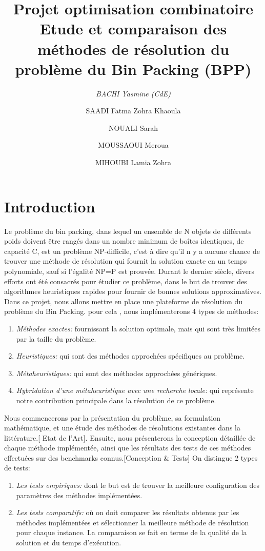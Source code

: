 \documentclass[12pt,a4paper, titlepage]{report}
\title{Projet optimisation combinatoire\\ Etude et comparaison des méthodes de résolution du problème du Bin Packing (BPP)}
\author{ 
    \emph{BACHI Yasmine (CdE)}
    \and
    SAADI Fatma Zohra Khaoula
    \and 
    NOUALI Sarah
    \and 
    MOUSSAOUI Meroua
    \and 
    MIHOUBI Lamia Zohra}
\begin{document}
    \maketitle
    
    \tableofcontents
    \chapter*{Introduction}
      
    Le problème du bin packing, dans lequel un ensemble de N objets de différents poids doivent être rangés dans un nombre minimum de boîtes identiques, de capacité C, est un problème NP-difficile, c’est à dire qu’il n y a aucune chance de trouver une méthode de résolution qui fournit la solution exacte en un temps polynomiale, sauf si l’égalité NP=P est prouvée. 
    Durant le dernier siècle, divers efforts ont été consacrés pour étudier ce problème, dans le but de trouver des algorithmes heuristiques rapides pour fournir de bonnes solutions approximatives.
    Dans ce projet, nous allons mettre en place une plateforme de résolution du problème du Bin Packing. pour cela , nous implémenterons 4 types de méthodes: 
    \begin{enumerate}
        \item \emph{Méthodes exactes:} fournissant la solution optimale, mais qui sont très limitées par la taille du problème. 
        \item \emph{Heuristiques:} qui sont des méthodes approchées spécifiques au problème.
        \item \emph{Métaheuristiques:} qui sont des méthodes approchées génériques.
        \item \emph{Hybridation d'une métaheuristique avec une recherche locale:} qui représente notre contribution principale dans la résolution de ce problème.
    \end{enumerate}
    Nous commencerons par la présentation du problème, sa formulation mathématique, et une étude des méthodes de résolutions existantes dans la littérature.[ Etat de l’Art]. Ensuite, nous présenterons la conception détaillée de chaque méthode implémentée, ainsi que les résultats des tests de ces méthodes effectuées sur des benchmarks connus.[Conception \& Tests]
    On distingue 2 types de tests:
    \begin{enumerate}
        \item \emph{Les tests empiriques:} dont le but est de trouver la meilleure configuration des paramètres des méthodes implémentées.  
        \item \emph{Les tests comparatifs:} où on doit comparer les résultats obtenus par les méthodes implémentées et sélectionner la meilleure méthode de résolution pour chaque instance. La comparaison se fait en terme de la qualité de la solution et du temps d'exécution. 
    \end{enumerate}
\end{document}
